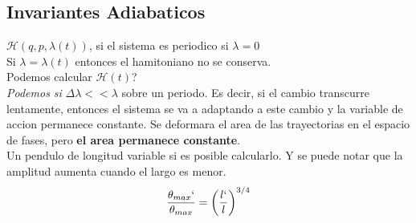 \documentclass[12pt]{article}
\renewcommand{\ss}[1]{\subsection{#1}}
\begin{document}
\ss{Invariantes Adiabaticos}
$\mathcal{H}(q,p,\lambda(t))$, si el sistema es periodico si $\lambda=0$\\
Si $\lambda = \lambda(t)$ entonces el hamitoniano no se conserva.\\
Podemos calcular $\mathcal{H}(t)$?\\
\textit{Podemos si} $\Delta \lambda << \lambda$ sobre un periodo. Es decir, si el cambio transcurre lentamente, entonces el sistema se va a adaptando a este cambio y la variable de accion permanece constante. Se deformara el area de las trayectorias en el espacio de fases, pero \textbf{el area permanece constante}.\\
Un pendulo de longitud variable si es posible calcularlo. Y se puede notar que la amplitud aumenta cuando el largo es menor.
$$\frac{\theta_{max}`}{\theta_{max}}= \qty(\frac{l`}{l})^{3/4}$$
\end{document}
